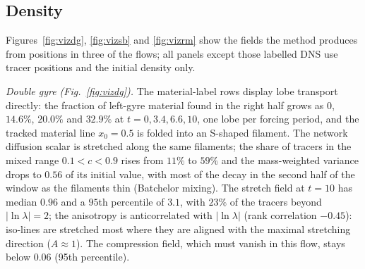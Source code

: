 \documentclass[11pt]{article}
\theoremstyle{definition}\newtheorem{definition}{Definition}\theoremstyle{remark}\newtheorem{remark}{Remark}
\begin{document}
\subsection{Density}
Figures~\ref{fig:vizdg}, \ref{fig:vizsb} and \ref{fig:vizrm} show the fields the method produces from positions in three of the flows; all panels except those labelled DNS use tracer positions and the initial density only.

\emph{Double gyre (Fig.~\ref{fig:vizdg}).} The material-label rows display lobe transport directly: the fraction of left-gyre material found in the right half grows as $0$, $14.6\%$, $20.0\%$ and $32.9\%$ at $t=0,3.4,6.6,10$, one lobe per forcing period, and the tracked material line $x_0=0.5$ is folded into an S-shaped filament. The network diffusion scalar is stretched along the same filaments; the share of tracers in the mixed range $0.1<c<0.9$ rises from $11\%$ to $59\%$ and the mass-weighted variance drops to $0.56$ of its initial value, with most of the decay in the second half of the window as the filaments thin (Batchelor mixing). The stretch field at $t=10$ has median $0.96$ and a $95$th percentile of $3.1$, with $23\%$ of the tracers beyond $|\ln\lambda|=2$; the anisotropy is anticorrelated with $|\ln\lambda|$ (rank correlation $-0.45$): iso-lines are stretched most where they are aligned with the maximal stretching direction ($A\approx1$). The compression field, which must vanish in this flow, stays below $0.06$ (95th percentile).
\end{document}
